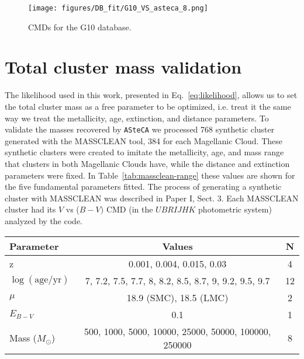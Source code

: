 \documentclass{aa}
\begin{document}
\begin{appendix}
\begin{figure}
\centering
\texttt{[image: figures/DB\_fit/G10\_VS\_asteca\_8.png]}
\caption{CMDs for the G10 database.}
\label{fig:DBs_G10_8}
\end{figure}
\clearpage





\section{Total cluster mass validation}
\label{apdx:mass_valid}

The likelihood used in this work, presented in Eq.~\ref{eq:likelihood}, allows
us to set the total cluster mass as a free parameter to be optimized, i.e.
treat it the same way we treat the metallicity, age, extinction, and distance
parameters.
To validate the masses recovered by \texttt{ASteCA} we processed 768 synthetic
cluster generated with the MASSCLEAN tool, 384 for each Magellanic Cloud.
%
These synthetic clusters were created to imitate the metallicity, age, and mass
range that clusters in both Magellanic Clouds have, while the distance and
extinction parameters were fixed. In Table~\ref{tab:massclean-range} these
values are shown for the five fundamental parameters fitted.
The process of generating a synthetic cluster with MASSCLEAN was described in
Paper I, Sect. 3. Each MASSCLEAN cluster had its $V$ vs ($B-V)$ CMD (in the
$UBRIJHK$ photometric system) analyzed by the code.

\begin{table*}
\centering
\caption{Parameters values used to generate the set of 768 MASSCLEAN
synthetic clusters.}
\label{tab:massclean-range}
\begin{tabular}{lcc}
\hline\hline
 Parameter & Values & N\\
\hline
z & 0.001, 0.004, 0.015, 0.03 & 4\\
$\log\mathrm{(age/yr)}$ & 7, 7.2, 7.5, 7.7, 8, 8.2, 8.5, 8.7, 9, 9.2, 9.5, 9.7 &
12\\
$\mu$ & 18.9 (SMC), 18.5 (LMC) & 2\\
$E_{B-V}$ & 0.1 & 1\\
Mass ($M_{\odot}$) & 500, 1000, 5000, 10000, 25000, 50000, 100000, 250000 & 8\\
\hline
\end{tabular}
\end{table*}


\end{appendix}
\end{document}
